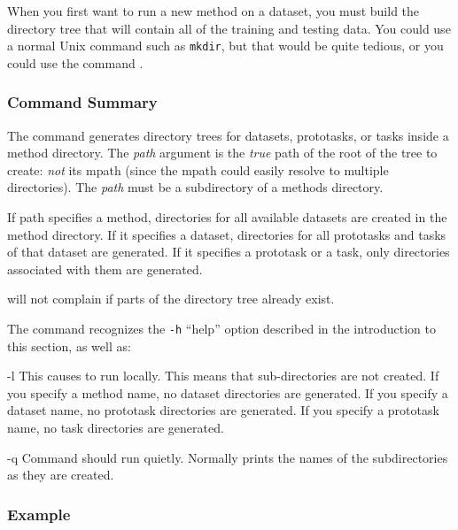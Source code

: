 %
%


When you first want to run a new method on a dataset, you must build
the directory tree that will contain all of the training and testing
data.  You could use a normal Unix command such as \texttt{mkdir}, but
that would be quite tedious, or you could use the \delve{} command
\mgendir.

\subsubsection*{Command Summary}

The \mgendir{} command generates directory trees for \delve{}
datasets, prototasks, or tasks inside a method directory.  The
\textit{path} argument is the \emph{true} path of the root of the tree
to create: \emph{not} its mpath (since the mpath could easily resolve to
multiple directories). The \textit{path} must be a subdirectory of a
\delve{} methods directory.

If path specifies a method, directories for all available datasets are
created in the method directory.  If it specifies a dataset,
directories for all prototasks and tasks of that dataset are
generated. If it specifies a prototask or a task, only directories
associated with them are generated.

\mgendir{} will not complain if parts of the directory tree already exist.

The \mgendir{} command recognizes the \texttt{-h} ``help'' option described in
the introduction to this section, as well as:
\begin{ttdescription}
\item[-l] 
    This causes \mgendir{} to run locally. This means that
    sub-directories are not created.  If you specify a method name, no
    dataset directories are generated.  If you specify a dataset name,
    no prototask directories are generated.  If you specify a
    prototask name, no task directories are generated.
\item[-q]
    Command should run quietly. Normally \mgendir{} prints the names of the
subdirectories as they are created.
\end{ttdescription}

\subsubsection*{Example}

